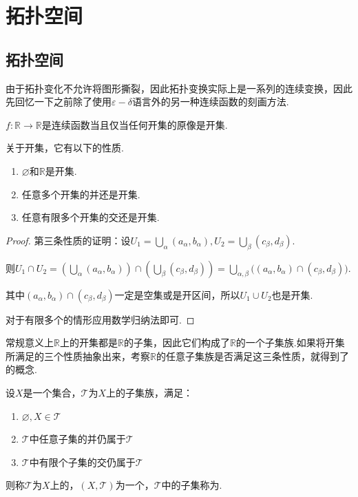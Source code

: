 \chapter{拓扑空间}

\section{拓扑空间}

由于拓扑变化不允许将图形撕裂，因此拓扑变换实际上是一系列的连续变换，因此先回忆一下之前除了使用$\varepsilon-\delta$语言外的另一种连续函数的刻画方法.

\begin{theorem}[][thm:2.1]
    $f:\mathbb{R}\to\mathbb{R}$是连续函数当且仅当任何开集的原像是开集.
\end{theorem}

关于开集，它有以下的性质.

\begin{proposition}[实数集上开集的性质][prop:2.1]
    \begin{enumerate}
        \item $\varnothing$和$\mathbb{R}$是开集.
        \item 任意多个开集的并还是开集.
        \item 任意有限多个开集的交还是开集.
    \end{enumerate}
\end{proposition}
\begin{proof}
    第三条性质的证明：设$U_1=\bigcup_\alpha{(a_\alpha,b_\alpha)},U_2=\bigcup_\beta{(c_\beta,d_\beta)}$.\par
    则$U_1\cap U_2=\left(\bigcup_\alpha{(a_\alpha,b_\alpha)}\right)\cap\left(\bigcup_\beta{(c_\beta,d_\beta)}\right) = \bigcup_{\alpha,\beta}\big((a_\alpha,b_\alpha)\cap(c_\beta,d_\beta)\big)$.\par
    其中$(a_\alpha,b_\alpha)\cap(c_\beta,d_\beta)$一定是空集或是开区间，所以$U_1\cup U_2$也是开集.\par
    对于有限多个的情形应用数学归纳法即可.
\end{proof}

常规意义上$\mathbb{R}$上的开集都是$\mathbb{R}$的子集，因此它们构成了$\mathbb{R}$的一个子集族.如果将开集所满足的三个性质抽象出来，考察$\mathbb{R}$的任意子集族是否满足这三条性质，就得到了的概念.

\begin{definition}[拓扑空间][def:2.1]
    设$X$是一个集合，$\mathcal{T}$为$X$上的子集族，满足：
    \begin{enumerate}
        \item $\varnothing,X\in\mathcal{T}$
        \item $\mathcal{T}$中任意子集的并仍属于$\mathcal{T}$
        \item $\mathcal{T}$中有限个子集的交仍属于$\mathcal{T}$
    \end{enumerate}
    则称$\mathcal{T}$为$X$上的，$(X,\mathcal{T})$为一个，$\mathcal{T}$中的子集称为.
\end{definition}

